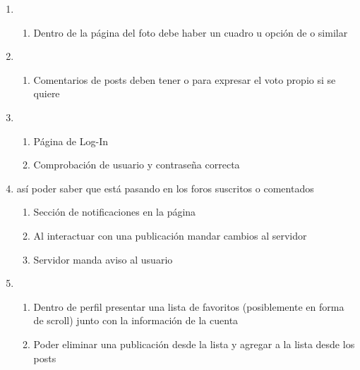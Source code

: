 \documentclass[12pt, letterpaper, notitlepage]{article}
\begin{document}
\begin{enumerate}
		
		\item {}
		\begin{enumerate}
			\item Dentro de la página del foto debe haber un cuadro u opción de  o similar
		\end{enumerate}
		
		
		\item {}
		\begin{enumerate}
			\item Comentarios de posts deben tener  o  para expresar el voto propio si se quiere
		\end{enumerate}
		
		
		\item {}
		\begin{enumerate}
			\item Página de Log-In
			\item Comprobación de usuario y contraseña correcta
		\end{enumerate}
		
		\item {}		
		{así poder saber que está pasando en los foros suscritos o comentados}
		\begin{enumerate}
			\item Sección de notificaciones en la página
			\item Al interactuar con una publicación mandar cambios al servidor
			\item Servidor manda aviso al usuario
		\end{enumerate}
		
		
		
		
		\item {}
		\begin{enumerate}
			\item Dentro de perfil presentar una lista de favoritos (posiblemente en forma de scroll) junto con la información de la cuenta
			\item Poder eliminar una publicación desde la lista y agregar a la lista desde los posts
		\end{enumerate}
		

\end{enumerate}
\end{document}
